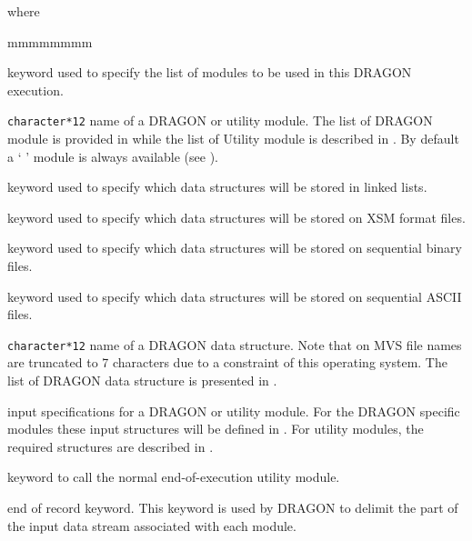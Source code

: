 \noindent where
\begin{ListeDeDescription}{mmmmmmmm}

\item[\moc{MODULE}]  keyword used to specify the list of modules to be used in
this DRAGON execution.

\item[\dusa{MODNAME}] {\tt character*12} name of a DRAGON or utility module.
The list of DRAGON module is provided in  while the list of
Utility module is described in . By default a ` ' module
is always available (see ).

\item[\moc{LINKED\_LIST}]  keyword used to specify which data structures will
be stored in linked lists. 

\item[\moc{XSM\_FILE}]  keyword used to specify which data structures will be
stored on XSM format files. 

\item[\moc{SEQ\_BINARY}]  keyword used to specify which data structures will be
stored on sequential binary files. 

\item[\moc{SEQ\_ASCII}]  keyword used to specify which data structures will be
stored on sequential ASCII files. 

\item[\dusa{STRNAME}] {\tt character*12} name of a DRAGON data structure.
Note that on MVS file names are truncated to 7 characters due to a constraint of
this operating system. The list of DRAGON data structure is presented in
.

\item[\dstr{module}] input specifications for a DRAGON or utility module.  For
the DRAGON specific modules these input structures will be defined in
. For utility modules, the required structures are
described in .

\item[\moc{END:}] keyword to call the normal end-of-execution utility module.

\item[\moc{;}] end of record keyword. This keyword is used by DRAGON to
delimit the part of the input data stream associated with each module.

\end{ListeDeDescription}

